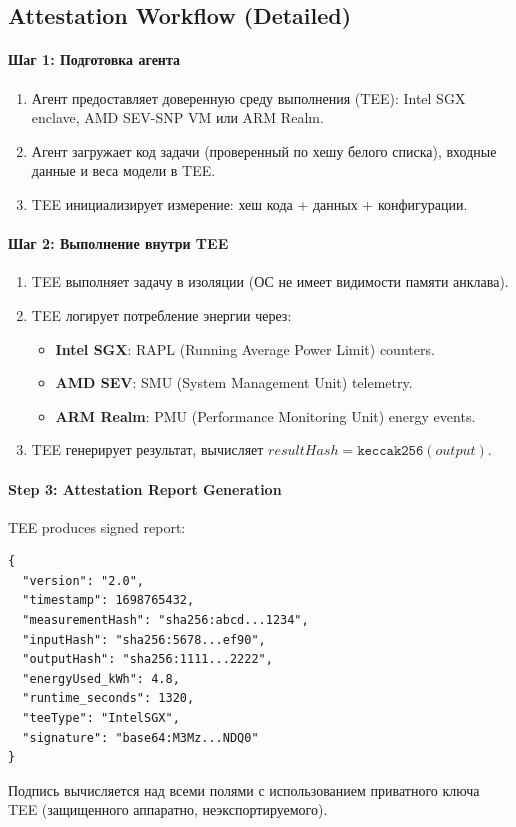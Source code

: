 \documentclass[11pt]{article}
\begin{document}
\subsection{Attestation Workflow (Detailed)}
\label{sec:attestation-workflow}
\paragraph{Шаг 1: Подготовка агента}
\begin{enumerate}[noitemsep]
  \item Агент предоставляет доверенную среду выполнения (TEE): Intel SGX enclave, AMD SEV-SNP VM или ARM Realm.
  \item Агент загружает код задачи (проверенный по хешу белого списка), входные данные и веса модели в TEE.
  \item TEE инициализирует измерение: хеш кода + данных + конфигурации.
\end{enumerate}

\paragraph{Шаг 2: Выполнение внутри TEE}
\begin{enumerate}[noitemsep]
  \item TEE выполняет задачу в изоляции (ОС не имеет видимости памяти анклава).
  \item TEE логирует потребление энергии через:
    \begin{itemize}[noitemsep]
      \item \textbf{Intel SGX}: RAPL (Running Average Power Limit) counters.
      \item \textbf{AMD SEV}: SMU (System Management Unit) telemetry.
      \item \textbf{ARM Realm}: PMU (Performance Monitoring Unit) energy events.
    \end{itemize}
  \item TEE генерирует результат, вычисляет $resultHash = \texttt{keccak256}(output)$.
\end{enumerate}

\paragraph{Step 3: Attestation Report Generation}
TEE produces signed report:
\begin{verbatim}
{
  "version": "2.0",
  "timestamp": 1698765432,
  "measurementHash": "sha256:abcd...1234",
  "inputHash": "sha256:5678...ef90",
  "outputHash": "sha256:1111...2222",
  "energyUsed_kWh": 4.8,
  "runtime_seconds": 1320,
  "teeType": "IntelSGX",
  "signature": "base64:M3Mz...NDQ0"
}
\end{verbatim}
Подпись вычисляется над всеми полями с использованием приватного ключа TEE (защищенного аппаратно, неэкспортируемого).
\end{document}
